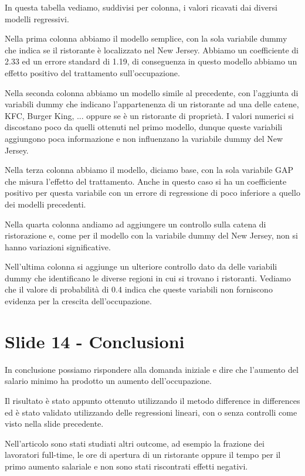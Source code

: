 \documentclass{article}
\begin{document}
In questa tabella vediamo, suddivisi per colonna, i valori ricavati dai diversi modelli regressivi.

Nella prima colonna abbiamo il modello semplice, con la sola variabile dummy che indica se il ristorante è localizzato nel New Jersey. Abbiamo un coefficiente di 2.33 ed un errore standard di 1.19, di conseguenza in questo modello abbiamo un effetto positivo del trattamento sull'occupazione.

Nella seconda colonna abbiamo un modello simile al precedente, con l'aggiunta di variabili dummy che indicano l'appartenenza di un ristorante ad una delle catene, KFC, Burger King, ... oppure se è un ristorante di proprietà. I valori numerici si discostano poco da quelli ottenuti nel primo modello, dunque queste variabili aggiungono poca informazione e non influenzano la variabile dummy del New Jersey.

Nella terza colonna abbiamo il modello, diciamo base, con la sola variabile GAP che misura l'effetto del trattamento. Anche in questo caso si ha un coefficiente positivo per questa variabile con un errore di regressione di poco inferiore a quello dei modelli precedenti.

Nella quarta colonna andiamo ad aggiungere un controllo sulla catena di ristorazione e, come per il modello con la variabile dummy del New Jersey, non si hanno variazioni significative.

Nell'ultima colonna si aggiunge un ulteriore controllo dato da delle variabili dummy che identificano le diverse regioni in cui si trovano i ristoranti. Vediamo che il valore di probabilità di 0.4 indica che queste variabili non forniscono evidenza per la crescita dell'occupazione.

\section{Slide 14 - Conclusioni}

In conclusione possiamo rispondere alla domanda iniziale e dire che l'aumento del salario minimo ha prodotto un aumento dell'occupazione.

Il risultato è stato appunto ottenuto utilizzando il metodo difference in differences ed è stato validato utilizzando delle regressioni lineari, con o senza controlli come visto nella slide precedente.


Nell'articolo sono stati studiati altri outcome, ad esempio la frazione dei lavoratori full-time,  le ore di apertura di un ristorante oppure il tempo per il primo aumento salariale e non sono stati riscontrati effetti negativi.
\end{document}

